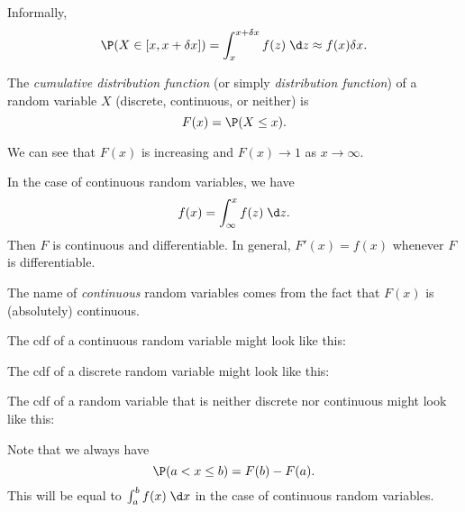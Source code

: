 \documentclass[a4paper]{article}
\begin{document}
Informally, 
\[
  \P(X \in [x, x + \delta x]) = \int_x^{x + \delta x} f(z) \;\d z \approx f(x) \delta x.
\]

\begin{defi}
  The \emph{cumulative distribution function} (or simply \emph{distribution function}) of a random variable $X$ (discrete, continuous, or neither) is
  \[
    F(x) = \P(X \leq x).
  \]
\end{defi}
We can see that $F(x)$ is increasing and $F(x) \to 1$ as $x\to \infty$.

In the case of continuous random variables, we have
\[
  f(x) = \int_\infty^x f(z) \;\d z.
\]
Then $F$ is continuous and differentiable. In general, $F'(x) = f(x)$ whenever $F$ is differentiable.

The name of \emph{continuous} random variables comes from the fact that $F(x)$ is (absolutely) continuous.

The cdf of a continuous random variable might look like this:
\begin{center}
\end{center}

The cdf of a discrete random variable might look like this:
\begin{center}
\end{center}

The cdf of a random variable that is neither discrete nor continuous might look like this:
\begin{center}
\end{center}
Note that we always have
\[
  \P(a < x \leq b) = F(b) - F(a).
\]
This will be equal to $\int_a^b f(x)\;\d x$ in the case of continuous random variables.
\end{document}
